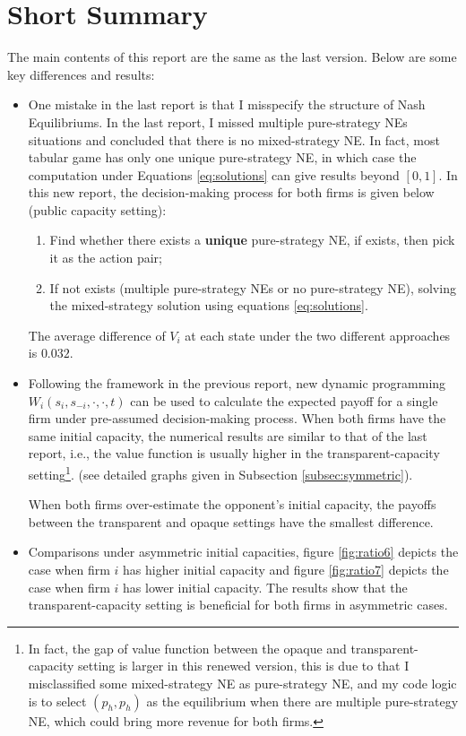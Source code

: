 \documentclass[12pt,letterpaper]{article}
\begin{document}
\section{Short Summary}

The main contents of this report are the same as the last version. Below are some key differences and results:

\begin{itemize}
    \item One mistake in the last report is that I misspecify the structure of Nash Equilibriums. In the last report, I missed multiple pure-strategy NEs situations and concluded that there is no mixed-strategy NE. In fact, most tabular game has only one unique pure-strategy NE, in which case the computation under Equations \ref{eq:solutions} can give results beyond $[0,1]$. In this new report, the decision-making process for both firms is given below (public capacity setting):
    \begin{enumerate}
        \item Find whether there exists a \textbf{unique} pure-strategy NE, if exists, then pick it as the action pair;
        \item If not exists (multiple pure-strategy NEs or no pure-strategy NE), solving the mixed-strategy solution using equations \ref{eq:solutions}.
    \end{enumerate}
    The average difference of $V_i$ at each state under the two different approaches is $0.032$.

    \item Following the framework in the previous report, new dynamic programming $W_i(s_i,s_{-i},\cdot,\cdot,t)$ can be used to calculate the expected payoff for a single firm under pre-assumed decision-making process. When both firms have the same initial capacity, the numerical results are similar to that of the last report, i.e., the value function is usually higher in the transparent-capacity setting\footnote{In fact, the gap of value function between the opaque and transparent-capacity setting is larger in this renewed version, this is due to that I misclassified some mixed-strategy NE as pure-strategy NE, and my code logic is to select $(p_h,p_h)$ as the equilibrium when there are multiple pure-strategy NE, which could bring more revenue for both firms.}. (see detailed graphs given in Subsection \ref{subsec:symmetric}).

    When both firms over-estimate the opponent's initial capacity, the payoffs between the transparent and opaque settings have the smallest difference.

    \item Comparisons under asymmetric initial capacities, figure \ref{fig:ratio6} depicts the case when firm $i$ has higher initial capacity and figure \ref{fig:ratio7} depicts the case when firm $i$ has lower initial capacity. The results show that the transparent-capacity setting is beneficial for both firms in asymmetric cases.
\end{itemize}
\end{document}
